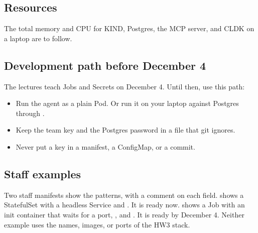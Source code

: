 \documentclass[9pt,letterpaper]{article}
\begin{document}
\subsection{Resources}\label{sec:resources}

The total memory and CPU for KIND, Postgres, the MCP server, and CLDK on a
laptop are to follow.

\subsection{Development path before December 4}\label{sec:devpath}

The lectures teach Jobs and Secrets on December 4. Until then, use this path:
\begin{itemize}
\item Run the agent as a plain Pod. Or run it on your laptop against Postgres
  through .
\item Keep the team key and the Postgres password in a  file that git
  ignores.
\item Never put a key in a manifest, a ConfigMap, or a commit.
\end{itemize}

\subsection{Staff examples}\label{sec:examples}

Two staff manifests show the patterns, with a comment on each field.
 shows a StatefulSet with a headless
Service and . It is ready now.
 shows a Job with an init container
that waits for a port, , and .
It is ready by December 4. Neither example uses the names, images, or ports of
the HW3 stack.
\end{document}

